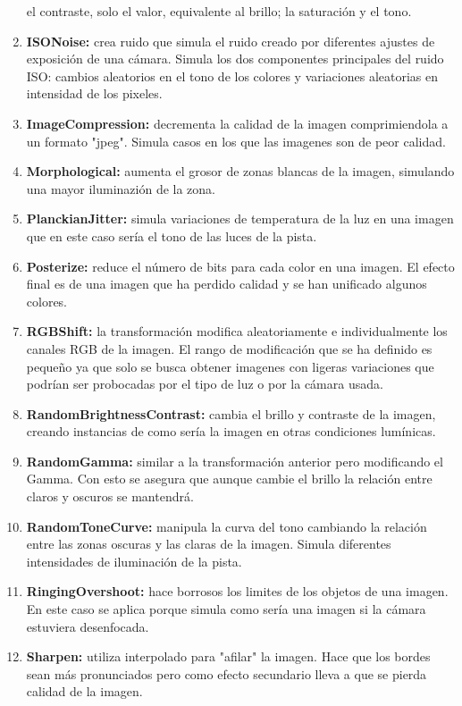 \documentclass[12pt]{report} %
\begin{document}
\begin{enumerate}
    el contraste, solo el valor, equivalente al brillo; la saturación y el
    tono.
    \item \textbf{ISONoise:} crea ruido que simula el ruido creado por
    diferentes ajustes de exposición de una cámara.  Simula los dos componentes
    principales del ruido ISO: cambios aleatorios en el tono de los colores y
    variaciones aleatorias en intensidad de los pixeles.
    \item \textbf{ImageCompression:} decrementa la calidad de la imagen
    comprimiendola a un formato "jpeg". Simula casos en los que las imagenes
    son de peor calidad.
    \item \textbf{Morphological:} aumenta el grosor de
    zonas blancas de la imagen, simulando una mayor iluminazión de la zona.
    \item \textbf{PlanckianJitter:} simula variaciones de temperatura de la luz
    en una imagen que en este caso sería el tono de las luces de la pista.
    \item \textbf{Posterize:} reduce el número de bits para cada color en una
    imagen. El efecto final es de una imagen que ha perdido calidad y se han
    unificado algunos colores.
    \item \textbf{RGBShift:} la transformación
    modifica aleatoriamente e individualmente los canales RGB de la imagen.  El
    rango de modificación que se ha definido es pequeño ya que solo se busca
    obtener imagenes con ligeras variaciones que podrían ser probocadas por el
    tipo de luz o por la cámara usada.
    \item \textbf{RandomBrightnessContrast:} cambia el brillo y contraste de la
    imagen, creando instancias de como sería la imagen en otras condiciones
    lumínicas.
    \item \textbf{RandomGamma:} similar a la transformación
    anterior pero modificando el Gamma. Con esto se asegura que aunque cambie
    el brillo la relación entre claros y oscuros se mantendrá.
    \item \textbf{RandomToneCurve:} manipula la curva del tono cambiando la relación
    entre las zonas oscuras y las claras de la imagen. Simula diferentes
    intensidades de iluminación de la pista.
    \item \textbf{RingingOvershoot:}
    hace borrosos los limites de los objetos de una imagen. En este caso se
    aplica porque simula como sería una imagen si la cámara estuviera
    desenfocada.
    \item \textbf{Sharpen:} utiliza interpolado para "afilar" la
    imagen. Hace que los bordes sean más pronunciados pero como efecto
    secundario lleva a que se pierda calidad de la imagen.
    \end{enumerate}
\end{document}
